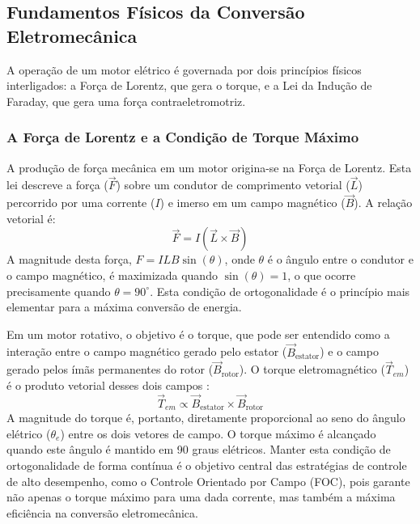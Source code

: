 \documentclass[12pt, a4paper, openright, oneside, brazilian]{abntex2}
\begin{document}
\subsection{Fundamentos Físicos da Conversão Eletromecânica}

A operação de um motor elétrico é governada por dois princípios físicos interligados: a Força de Lorentz, que gera o torque, e a Lei da Indução de Faraday, que gera uma força contraeletromotriz.

\subsubsection{A Força de Lorentz e a Condição de Torque Máximo}

A produção de força mecânica em um motor origina-se na Força de Lorentz. Esta lei descreve a força ($\vec{F}$) sobre um condutor de comprimento vetorial ($\vec{L}$) percorrido por uma corrente ($I$) e imerso em um campo magnético ($\vec{B}$). A relação vetorial é:
\begin{equation}
    \vec{F} = I(\vec{L} \times \vec{B})
\end{equation}
A magnitude desta força, $F = I L B \sin(\theta)$, onde $\theta$ é o ângulo entre o condutor e o campo magnético, é maximizada quando $\sin(\theta) = 1$, o que ocorre precisamente quando $\theta = 90^{\circ}$. Esta condição de ortogonalidade é o princípio mais elementar para a máxima conversão de energia.

Em um motor rotativo, o objetivo é o torque, que pode ser entendido como a interação entre o campo magnético gerado pelo estator ($\vec{B}_{\text{estator}}$) e o campo gerado pelos ímãs permanentes do rotor ($\vec{B}_{\text{rotor}}$). O torque eletromagnético ($\vec{T}_{em}$) é o produto vetorial desses dois campos \cite{vas1998vector}:
\begin{equation}
    \vec{T}_{em} \propto \vec{B}_{\text{estator}} \times \vec{B}_{\text{rotor}}
\end{equation}
A magnitude do torque é, portanto, diretamente proporcional ao seno do ângulo elétrico ($\theta_e$) entre os dois vetores de campo. O torque máximo é alcançado quando este ângulo é mantido em 90 graus elétricos. Manter esta condição de ortogonalidade de forma contínua é o objetivo central das estratégias de controle de alto desempenho, como o Controle Orientado por Campo (FOC), pois garante não apenas o torque máximo para uma dada corrente, mas também a máxima eficiência na conversão eletromecânica.
\end{document}
